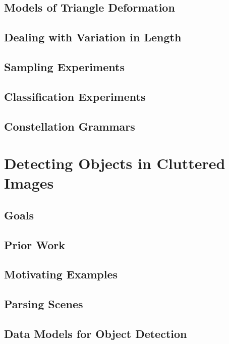 \documentclass{tufte-book}
\begin{document}
  \section{Models of Triangle Deformation}
    

  \section{Dealing with Variation in Length}
    
    

  \section{Sampling Experiments}

  \section{Classification Experiments}

  \section{Constellation Grammars}

\chapter{Detecting Objects in Cluttered Images}

  \section{Goals}
    

  \section{Prior Work}

  \section{Motivating Examples}

  \section{Parsing Scenes}

  \section{Data Models for Object Detection}
\end{document}
